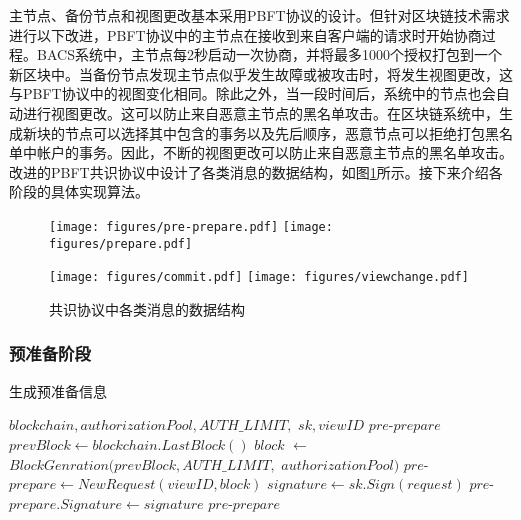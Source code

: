 主节点、备份节点和视图更改基本采用PBFT协议的设计。但针对区块链技术需求进行以下改进，PBFT协议中的主节点在接收到来自客户端的请求时开始协商过程。BACS系统中，主节点每2秒启动一次协商，并将最多1000个授权打包到一个新区块中。当备份节点发现主节点似乎发生故障或被攻击时，将发生视图更改，这与PBFT协议中的视图变化相同。除此之外，当一段时间后，系统中的节点也会自动进行视图更改。这可以防止来自恶意主节点的黑名单攻击。在区块链系统中，生成新块的节点可以选择其中包含的事务以及先后顺序，恶意节点可以拒绝打包黑名单中帐户的事务。因此，不断的视图更改可以防止来自恶意主节点的黑名单攻击。改进的PBFT共识协议中设计了各类消息的数据结构，如图\ref{fig:pbft-data}所示。接下来介绍各阶段的具体实现算法。

\begin{figure}
  \centering%
    {\texttt{[image: figures/pre-prepare.pdf]}}%
  \hspace{2em}%
      {\texttt{[image: figures/prepare.pdf]}}

      {\texttt{[image: figures/commit.pdf]}}
  \hspace{2em}%
      {\texttt{[image: figures/viewchange.pdf]}}
  \caption{共识协议中各类消息的数据结构}
  \label{fig:pbft-data}
\end{figure}

\subsubsection{预准备阶段}

 \begin{algorithm}
 \caption{生成预准备信息}\label{alg:preprepareGen}
   \begin{algorithmic}[H]
   \renewcommand{\algorithmicrequire}{\textbf{Input:}}
   \renewcommand{\algorithmicensure}{\textbf{Output:}}
   \REQUIRE $blockchain, authorizationPool, AUTH\_LIMIT,$ $sk, viewID$
   \ENSURE  $pre$-$prepare$
    \STATE $prevBlock \gets blockchain.LastBlock()$
    \STATE $block$ $\gets$ $BlockGenration(prevBlock, AUTH\_LIMIT,$ $authorizationPool)$
    \STATE $pre$-$prepare \gets NewRequest(viewID, block)$
    \STATE $signature \gets sk.Sign(request)$
    \STATE $pre$-$prepare.Signature \gets signature$
   \RETURN $pre$-$prepare$
   \end{algorithmic}
 \end{algorithm}

